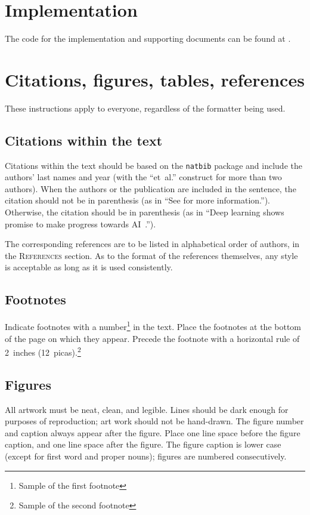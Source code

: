\documentclass{article} %
\begin{document}
\section{Implementation}
The code for the implementation and supporting documents can be found at \cite{Stelling:aa}.

\section{Citations, figures, tables, references}
\label{others}

These instructions apply to everyone, regardless of the formatter being used.

\subsection{Citations within the text}


Citations within the text should be based on the \texttt{natbib} package
and include the authors' last names and year (with the ``et~al.'' construct
for more than two authors). When the authors or the publication are
included in the sentence, the citation should not be in parenthesis (as
in ``See \citet{Goodfellow:2016aa} for more information.''). Otherwise, the citation
should be in parenthesis (as in ``Deep learning shows promise to make progress towards AI~\citep{Goodfellow:2016aa}.'').

The corresponding references are to be listed in alphabetical order of
authors, in the \textsc{References} section. As to the format of the
references themselves, any style is acceptable as long as it is used
consistently.

\subsection{Footnotes}

Indicate footnotes with a number\footnote{Sample of the first footnote} in the
text. Place the footnotes at the bottom of the page on which they appear.
Precede the footnote with a horizontal rule of 2~inches
(12~picas).\footnote{Sample of the second footnote}

\subsection{Figures}

All artwork must be neat, clean, and legible. Lines should be dark
enough for purposes of reproduction; art work should not be
hand-drawn. The figure number and caption always appear after the
figure. Place one line space before the figure caption, and one line
space after the figure. The figure caption is lower case (except for
first word and proper nouns); figures are numbered consecutively.
\end{document}
